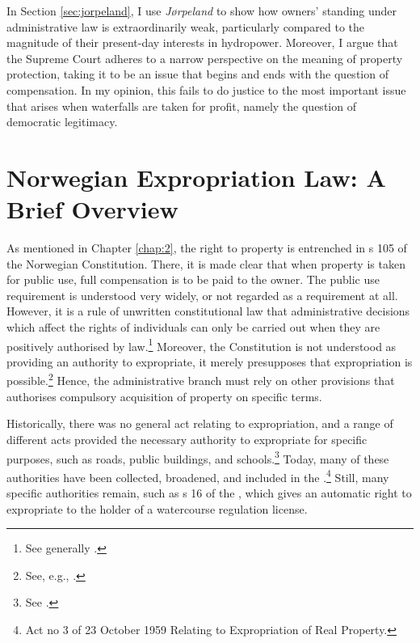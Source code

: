 In Section \ref{sec:jorpeland}, I use {\it Jørpeland} to show how owners' standing under administrative law is extraordinarily weak, particularly compared to the magnitude of their present-day interests in hydropower. Moreover, I argue that the Supreme Court adheres to a narrow perspective on the meaning of property protection, taking it to be an issue that begins and ends with the question of compensation. In my opinion, this fails to do justice to the most important issue that arises when waterfalls are taken for profit, namely the question of democratic legitimacy. 


\section{Norwegian Expropriation Law: A Brief Overview}\label{sec:explaw}

As mentioned in Chapter \ref{chap:2}, the right to property is entrenched in s 105 of the Norwegian Constitution. There, it is made clear that when property is taken for public use, full compensation is to be paid to the owner. The public use requirement is understood very widely, or not regarded as a requirement at all. However, it is a rule of unwritten constitutional law that administrative decisions which affect the rights of individuals can only be carried out when they are positively authorised by law.\footnote{See generally \cite{hogberg11}.} Moreover, the Constitution is not understood as providing an authority to expropriate, it merely presupposes that expropriation is possible.\footnote{See, e.g., \cite[6]{fleischer86}.} Hence, the administrative branch must rely on other provisions that authorises compulsory acquisition of property on specific terms.

Historically, there was no general act relating to expropriation, and a range of different acts provided the necessary authority to expropriate for specific purposes, such as roads, public buildings, and schools.\footnote{See \cite[11-12]{nut54}.} Today, many of these authorities have been collected, broadened, and included in the \cite{ea59}.\footnote{Act no 3 of 23 October 1959 Relating to Expropriation of Real Property.} Still, many specific authorities remain, such as s 16 of the \cite{wra17}, which gives an automatic right to expropriate to the holder of a watercourse regulation license.

